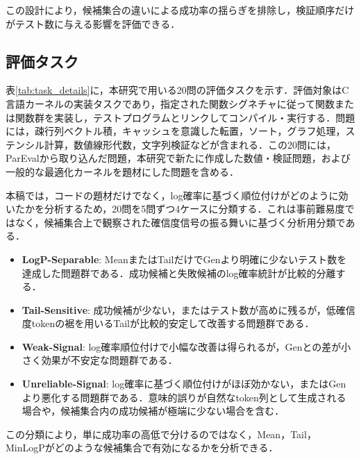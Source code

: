 \documentclass[submit,techrep,noauthor]{ipsj}
\begin{document}
この設計により，候補集合の違いによる成功率の揺らぎを排除し，検証順序だけがテスト数に与える影響を評価できる．

\subsection{評価タスク}

表\ref{tab:task_details}に，本研究で用いる20問の評価タスクを示す．評価対象はC言語カーネルの実装タスクであり，指定された関数シグネチャに従って関数または関数群を実装し，テストプログラムとリンクしてコンパイル・実行する．問題には，疎行列ベクトル積，キャッシュを意識した転置，ソート，グラフ処理，ステンシル計算，数値線形代数，文字列検証などが含まれる．この20問には，ParEvalから取り込んだ問題，本研究で新たに作成した数値・検証問題，および一般的な最適化カーネルを題材にした問題を含める．

本稿では，コードの題材だけでなく，log確率に基づく順位付けがどのように効いたかを分析するため，20問を5問ずつ4ケースに分類する．これは事前難易度ではなく，候補集合上で観察された確信度信号の振る舞いに基づく分析用分類である．

\begin{itemize}
\item \textbf{LogP-Separable}: MeanまたはTailだけでGenより明確に少ないテスト数を達成した問題群である．成功候補と失敗候補のlog確率統計が比較的分離する．
\item \textbf{Tail-Sensitive}: 成功候補が少ない，またはテスト数が高めに残るが，低確信度tokenの裾を用いるTailが比較的安定して改善する問題群である．
\item \textbf{Weak-Signal}: log確率順位付けで小幅な改善は得られるが，Genとの差が小さく効果が不安定な問題群である．
\item \textbf{Unreliable-Signal}: log確率に基づく順位付けがほぼ効かない，またはGenより悪化する問題群である．意味的誤りが自然なtoken列として生成される場合や，候補集合内の成功候補が極端に少ない場合を含む．
\end{itemize}

この分類により，単に成功率の高低で分けるのではなく，Mean，Tail，MinLogPがどのような候補集合で有効になるかを分析できる．
\end{document}

